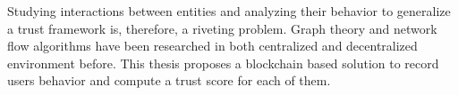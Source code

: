 Studying interactions between entities and analyzing their behavior to
generalize a trust framework is, therefore, a riveting problem. Graph theory
and network flow algorithms have been researched in both centralized and
decentralized environment before. This thesis proposes a blockchain based
solution to record users behavior and compute a trust score for each of them. 



%


